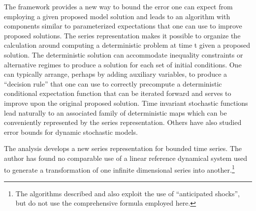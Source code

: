 \documentclass[12pt]{article}
\begin{document}
The framework provides a new way to bound the error one can expect from
employing a given proposed model solution and leads to an
algorithm with  components similar to parameterized expectations that
one can use to improve proposed solutions. The series representation makes
it possible to organize the calculation around computing a deterministic
problem at time t given a proposed solution.  The deterministic solution
can accommodate inequality constraints or alternative regimes to produce a
solution for each set of initial conditions.  One can typically arrange,
perhaps by adding auxiliary variables, to produce a ``decision rule''
that one can use to correctly precompute a deterministic conditional
expectation function that can be iterated forward and serves to
improve upon the original proposed solution.
Time invariant stochastic functions 
lead naturally to an associated family of deterministic maps
which can be conveniently represented by the series representation.
Others have also studied error bounds for dynamic stochastic models.\cite{judd2017lower,santos2005accuracy,Santos2000accuracy}

The analysis develops a new series representation for bounded time series.  The author has found no comparable use of a linear reference dynamical system 
used to generate a transformation of one infinite dimensional series into another.\footnote{The algorithms described \cite{holden15:_exist_dsge} and \cite{guerrieri15:_occbin} also exploit the use of ``anticipated shocks'', but do not use the comprehensive formula employed here. }
\end{document}
